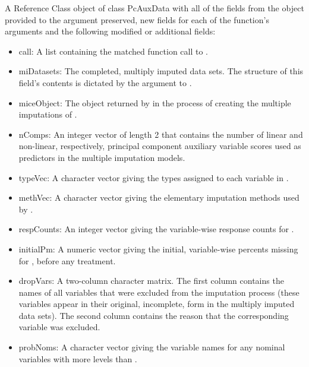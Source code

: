 \documentclass[letterpaper]{book}
\begin{document}
%
\begin{Value}
A Reference Class object of class PcAuxData with all of the fields
from the object provided to the  argument preserved,
new fields for each of the  function's arguments and
the following modified or additional fields:
\begin{itemize}

\item call: 
A list containing the matched function call to .

\item miDatasets: 
The completed, multiply imputed data sets. The structure of this
field's contents is dictated by the  argument to
.

\item miceObject: 
The  object returned by  in the process of
creating the multiple imputations of .

\item nComps: 
An integer vector of length 2 that contains the number of linear
and non-linear, respectively, principal component auxiliary
variable scores used as predictors in the multiple imputation
models.

\item typeVec: 
A character vector giving the types assigned to each variable in
. 

\item methVec: 
A character vector giving the elementary imputation methods used
by .

\item respCounts: 
An integer vector giving the variable-wise response counts for
. 

\item initialPm: 
A numeric vector giving the initial, variable-wise percents
missing for , before any treatment.

\item dropVars: 
A two-column character matrix. The first column contains the names
of all variables that were excluded from the imputation process
(these variables appear in their original, incomplete, form in the
multiply imputed data sets). The second column contains the
reason that the corresponding variable was excluded.

\item probNoms: 
A character vector giving the variable names for any nominal
variables with more levels than .


\end{itemize}
\end{Value}
\end{document}
